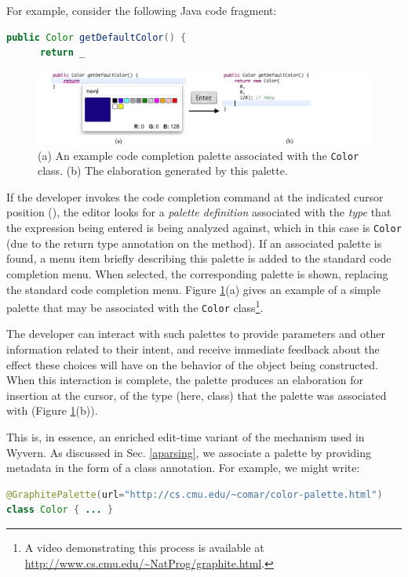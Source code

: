 For example, consider the following Java code fragment:

\begin{lstlisting}[language=Java]
  public Color getDefaultColor() {
      return _
\end{lstlisting}

\begin{figure}\label{color}
\begin{center}
\includegraphics[width=40pc]{color_palette.png}\end{center}
\caption{(a) An example code completion palette associated with the \texttt{Color} class. (b) The elaboration generated by this palette.}
\label{colorpalette}
\end{figure}

If the developer invokes the code completion command at the indicated cursor position (\li{_}), the editor  looks  for a {\it palette definition} associated with the {\it type} that the expression being entered is being analyzed against, which in this case is  \verb|Color| (due to the return type annotation on the method). If an associated palette is found, a menu item briefly describing this palette is added to the standard code completion menu. When selected, the corresponding palette is shown, replacing the standard code completion menu. Figure \ref{colorpalette}(a) gives an example of a simple palette that may be associated with the \verb|Color| class\footnote{A video demonstrating this process is available at \url{http://www.cs.cmu.edu/~NatProg/graphite.html}.}. 

The developer can interact with such palettes to provide parameters and other information related to their intent, and receive immediate feedback about the effect these choices will have on the behavior of the object being constructed. When this interaction is complete, the palette produces an elaboration for insertion at the cursor, of the type (here, class) that the palette was associated with (Figure \ref{colorpalette}(b)).

This is, in essence, an enriched edit-time variant of the mechanism used in Wyvern. As discussed in Sec. \ref{aparsing}, we associate a palette by providing metadata in the form of a class annotation. For example, we might write:
\begin{lstlisting}[language=Java]
@GraphitePalette(url="http://cs.cmu.edu/~comar/color-palette.html")
class Color { ... }
\end{lstlisting}

